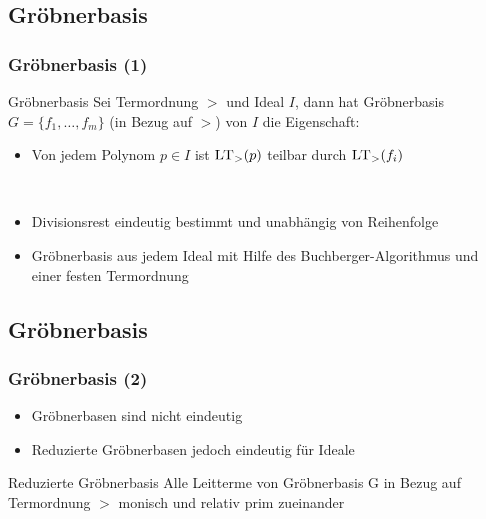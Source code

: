 \documentclass{beamer}
\begin{document}
\subsection{Gröbnerbasis}


\begin{frame}[fragile]
\frametitle{Gröbnerbasis (1)}


\begin{block}{Gröbnerbasis  }
Sei Termordnung $>$ und Ideal $I$, dann hat Gröbnerbasis $G = \{f_{1}, \ldots, f_{m} \}$ (in Bezug auf $>$) von $I$ die Eigenschaft: 
\begin{itemize}
\item Von jedem Polynom $p \in I$ ist $\textsc{LT}_{>}(p)$ teilbar durch $\textsc{LT}_{>}(f_{i})$  
\end{itemize} 
\end{block}

~\\
\begin{itemize}
\item Divisionsrest eindeutig bestimmt und unabhängig von Reihenfolge
~\\
\item Gröbnerbasis aus jedem Ideal mit Hilfe des Buchberger-Algorithmus und einer festen Termordnung 
\end{itemize}



\end{frame}



\subsection{Gröbnerbasis}


\begin{frame}[fragile]
\frametitle{Gröbnerbasis (2)}

\begin{itemize}
\item Gröbnerbasen sind nicht eindeutig

\item Reduzierte Gröbnerbasen jedoch eindeutig für Ideale
\end{itemize}

\begin{block}{Reduzierte Gröbnerbasis}
Alle Leitterme von Gröbnerbasis G in Bezug auf Termordnung $>$ monisch und relativ prim zueinander 
\end{block}




\end{frame}
\end{document}
